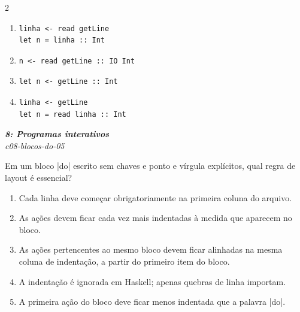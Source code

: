 \documentclass[a4paper,10pt,brazil]{article}
\begin{document}
\begin{multicols}{2}
\begin{enumerate}
  \item \begin{verbatim}
linha <- read getLine
let n = linha :: Int
\end{verbatim}

  \item \begin{verbatim}
n <- read getLine :: IO Int
\end{verbatim}

  \item \begin{verbatim}
let n <- getLine :: Int
\end{verbatim}

  \item \begin{verbatim}
linha <- getLine
let n = read linha :: Int
\end{verbatim}


\end{enumerate}

\begin{flushright}
  \footnotesize
  \textit{\textbf{8: Programas interativos}}\\
  \textit{c08-blocos-do-05}\\

\end{flushright}
Em um bloco \haskellinline|do| escrito sem chaves e ponto e vírgula explícitos, qual regra de layout é essencial?

\begin{enumerate}
  \item Cada linha deve começar obrigatoriamente na primeira coluna do arquivo.

  \item As ações devem ficar cada vez mais indentadas à medida que aparecem no bloco.

  \item As ações pertencentes ao mesmo bloco devem ficar alinhadas na mesma coluna de indentação, a partir do primeiro item do bloco.

  \item A indentação é ignorada em Haskell; apenas quebras de linha importam.

  \item A primeira ação do bloco deve ficar menos indentada que a palavra \haskellinline|do|.


\end{enumerate}


\end{multicols}
\end{document}
